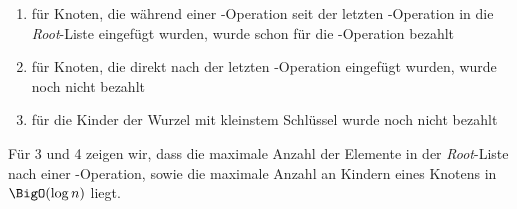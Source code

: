 \begin{description}
\begin{itemize}
\begin{enumerate}
					\item für Knoten, die während einer \decKey-Operation seit der letzten \exMin-Operation in die \textit{Root}-Liste eingefügt wurden, wurde schon für die \cons-Operation bezahlt
					\item für Knoten, die direkt nach der letzten \exMin-Operation eingefügt wurden, wurde noch nicht bezahlt
					\item für die Kinder der Wurzel mit kleinstem Schlüssel wurde noch nicht bezahlt
				\end{enumerate}
		\end{itemize}
		Für 3 und 4 zeigen wir, dass die maximale Anzahl der Elemente in der \textit{Root}-Liste nach einer \cons-Operation, sowie die maximale Anzahl an Kindern eines Knotens in $\BigO(\log n)$ liegt.
\end{description}
\topbreak\ \\\up\up\up
